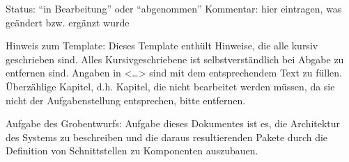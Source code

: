 Status: "`in Bearbeitung"' oder "`abgenommen"'
Kommentar: hier eintragen, was ge\"andert bzw. ergänzt wurde


Hinweis zum Template:
Dieses Template enth\"ult Hinweise, die alle kursiv geschrieben sind. Alles
Kursivgeschriebene ist selbstverst\"andlich bei Abgabe zu entfernen sind.
Angaben in <\ldots> sind mit dem entsprechendem Text zu f\"ullen.  \"Uberz\"ahlige
Kapitel, d.h. Kapitel, die nicht bearbeitet werden m\"ussen, da sie nicht der
Aufgabenstellung entsprechen, bitte entfernen.

Aufgabe des Grobentwurfs: Aufgabe dieses Dokumentes ist es, die Architektur des
Systems zu beschreiben und die daraus resultierenden Pakete durch die
Definition von Schnittstellen zu Komponenten auszubauen.
